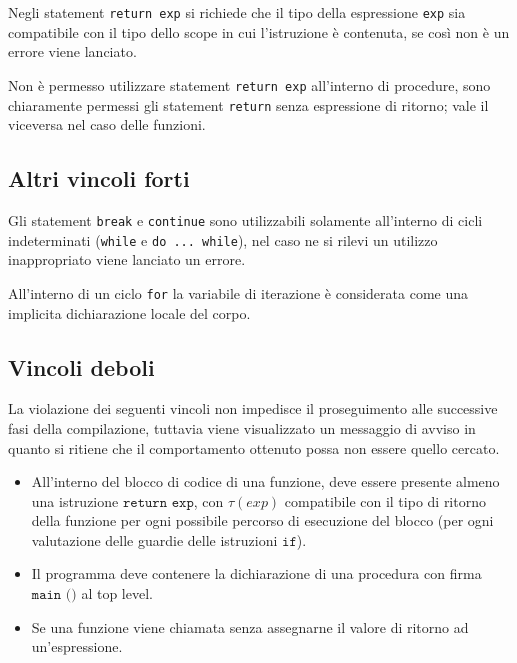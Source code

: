 Negli statement \texttt{return exp} si richiede che il tipo della espressione \texttt{exp} sia compatibile con il tipo dello scope in cui l'istruzione è contenuta, se così non è un errore viene lanciato.

Non è permesso utilizzare statement \texttt{return exp} all'interno di procedure, sono chiaramente permessi gli statement \texttt{return} senza espressione di ritorno; vale il viceversa nel caso delle funzioni.

\subsection*{Altri vincoli forti}
Gli statement \texttt{break} e \texttt{continue} sono utilizzabili solamente all'interno di cicli indeterminati (\texttt{while} e \texttt{do ... while}), nel caso ne si rilevi un utilizzo inappropriato viene lanciato un errore.

All'interno di un ciclo \texttt{for} la variabile di iterazione è considerata come una implicita dichiarazione locale del corpo.
\subsection*{Vincoli deboli}
La violazione dei seguenti vincoli non impedisce il proseguimento alle successive fasi della compilazione, tuttavia viene visualizzato un messaggio di avviso in quanto si ritiene che il comportamento ottenuto possa non essere quello cercato.

\begin{itemize}
	\item All'interno del blocco di codice di una funzione, deve essere presente almeno una istruzione $\texttt{return exp}$, con $\tau(exp)$ compatibile con il tipo di ritorno della funzione per ogni possibile percorso di esecuzione del blocco (per ogni valutazione delle guardie delle istruzioni $\texttt{if}$).
	\item Il programma deve contenere la dichiarazione di una procedura con firma $\texttt{main ()}$ al top level.
	\item Se una funzione viene chiamata senza assegnarne il valore di ritorno ad un'espressione.
\end{itemize}
